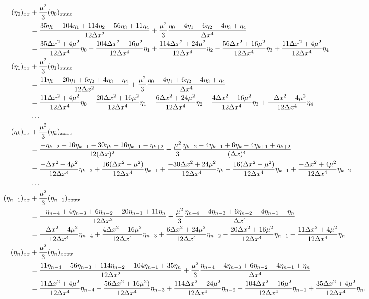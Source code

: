 \documentclass[10pt,reqno,oneside,a4paper]{article}
\begin{document}
\begin{align*}
(\eta_0)_{xx} &+ \frac{\mu^2}{3} (\eta_0)_{xxxx}  \\
&= \frac{35\eta_0 -104 \eta_{1} +114 \eta_2 -56\eta_3 + 11\eta_4}{12\Delta x^2} + \frac{\mu^2}{3} \frac{\eta_0 -4 \eta_{1} +6 \eta_2 -4\eta_3 + \eta_4}{\Delta x^4} \\
&= \frac{35\Delta x^2 + 4 \mu^2}{12\Delta x^4} \eta_0 - \frac{104 \Delta x^2 + 16\mu^2}{12\Delta x^4} \eta_1 + \frac{114 \Delta x^2 + 24 \mu^2}{12\Delta x^4} \eta_2 - \frac{56 \Delta x^2 + 16\mu^2}{12\Delta x^4} \eta_3 + \frac{11 \Delta x^2 + 4\mu^2}{12\Delta x^4} \eta_4 \\
(\eta_1)_{xx} &+ \frac{\mu^2}{3} (\eta_1)_{xxxx} \\
&= \frac{11\eta_0 -20 \eta_{1} +6 \eta_2 + 4\eta_3 - \eta_4}{12\Delta x^2} +\frac{\mu^2}{3} \frac{\eta_0 -4 \eta_{1} +6 \eta_2 -4\eta_3 + \eta_4}{\Delta x^4} \\
&= \frac{11\Delta x^2 + 4 \mu^2}{12\Delta x^4} \eta_0 - \frac{20 \Delta x^2 + 16\mu^2}{12\Delta x^4} \eta_1 + \frac{6 \Delta x^2 + 24 \mu^2}{12\Delta x^4} \eta_2 + \frac{4 \Delta x^2 - 16\mu^2}{12\Delta x^4} \eta_3 + \frac{- \Delta x^2 + 4\mu^2}{12\Delta x^4} \eta_4 \\
&\ldots \\
(\eta_k)_{xx} &+ \frac{\mu^2}{3} (\eta_k)_{xxxx} \\
&= \frac{-\eta_{k-2} +16 \eta_{k-1} - 30\eta_k+16\eta_{k+1} - \eta_{k+2}}{12(\Delta x)^2} + 
\frac{\mu^2}{3} \frac{\eta_{k-2} -4 \eta_{k-1} + 6\eta_k - 4\eta_{k+1} + \eta_{k+2}}{(\Delta x)^4}\\
&=\frac{-\Delta x^2 + 4 \mu^2}{12\Delta x^4} \eta_{k-2} + \frac{16 (\Delta x^2 -\mu^2)}{12\Delta x^4} \eta_{k-1} + \frac{-30\Delta x^2 + 24 \mu^2}{12\Delta x^4} \eta_k - \frac{16(\Delta x^2 - \mu^2)}{12\Delta x^4} \eta_{k+1} + \frac{- \Delta x^2 + 4\mu^2}{12\Delta x^4} \eta_{k+2} \\
&\ldots \\
(\eta_{n-1})_{xx} &+ \frac{\mu^2}{3} (\eta_{n-1})_{xxxx} \\
&= \frac{-\eta_{n-4} + 4 \eta_{n-3} + 6 \eta_{n-2} -20 \eta_{n-1} + 11\eta_n}{12\Delta x^2}  + \frac{\mu^2}{3} \frac{\eta_{n-4} -4 \eta_{n-3} +6 \eta_{n-2} -4 \eta_{n-1} + \eta_n}{\Delta x^4} \\
&= \frac{-\Delta x^2 + 4 \mu^2}{12\Delta x^4} \eta_{n-4} + \frac{4 \Delta x^2 -16\mu^2}{12\Delta x^4} \eta_{n-3} + \frac{6\Delta x^2 + 24 \mu^2}{12\Delta x^4} \eta_{n-2} - \frac{20\Delta x^2 +16 \mu^2}{12\Delta x^4} \eta_{n-1} + \frac{11 \Delta x^2 + 4\mu^2}{12\Delta x^4} \eta_n \\
(\eta_{n})_{xx} &+ \frac{\mu^2}{3} (\eta_{n})_{xxxx} \\
&= 
\frac{11\eta_{n-4} -56 \eta_{n-3} + 114 \eta_{n-2} -104 \eta_{n-1} + 35\eta_n}{12\Delta x^2} + \frac{\mu^2}{3}\frac{\eta_{n-4} -4 \eta_{n-3} +6 \eta_{n-2} -4 \eta_{n-1} + \eta_n}{\Delta x^4} \\
&= \frac{11\Delta x^2 + 4 \mu^2}{12\Delta x^4} \eta_{n-4} - \frac{56 \Delta x^2 +16\mu^2)}{12\Delta x^4} \eta_{n-3} + \frac{114\Delta x^2 + 24 \mu^2}{12\Delta x^4} \eta_{n-2} - \frac{104\Delta x^2 +16 \mu^2}{12\Delta x^4} \eta_{n-1} + \frac{35 \Delta x^2 + 4\mu^2}{12\Delta x^4} \eta_n.
\end{align*}
\end{document}
